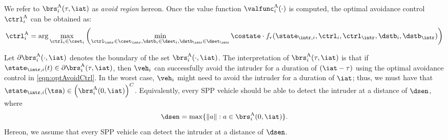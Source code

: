 We refer to $\brs^{\text{A}}_i(\tau, \iat)$ as \textit{avoid region} hereon. Once the value function $\valfunc^{\text{A}}_{i}(\cdot)$ is computed, the optimal avoidance control ${\ctrl^{\text{A}}_{i}}$ can be obtained as:
\begin{equation} \label{eqn:optAvoidCtrl}
{\ctrl^{\text{A}}_{i}} = \arg \max_{\ctrl_i \in \cset_i} \left( \min_{\ctrl_\intr \in \cset_\intr, \dstb_i \in \dset_i, \dstb_\intr \in \dset_\intr} \costate \cdot f_r(\state_{\intr, i}, \ctrl_i, \ctrl_\intr, \dstb_i, \dstb_\intr) \right)
\end{equation}

Let $\partial \brs^{\text{A}}_{i}(\cdot, \iat)$ denotes the boundary of the set $\brs^{\text{A}}_{i}(\cdot, \iat)$. The interpretation of $\brs^{\text{A}}_{i}(\tau, \iat)$ is that if $\state_{\intr, i}(t) \in \partial \brs^{\text{A}}_{i}(\tau, \iat)$, then $\veh_i$ can successfully avoid the intruder for a duration of $(\iat - \tau)$ using the optimal avoidance control in \eqref{eqn:optAvoidCtrl}. In the worst case, $\veh_i$ might need to avoid the intruder for a duration of $\iat$; thus, we must have that  
$\state_{\intr, i}(\tsa) \in \left(\brs^{\text{A}}_{i}(0, \iat)\right)^C$. Equivalently, every SPP vehicle should be able to detect the intruder at a distance of $\dsen$, where
\begin{equation} \label{eqn:sen_distance}
\dsen = \max\{ \|a\|: a \in \brs^{\text{A}}_{i}(0, \iat) \}.
\end{equation} 
Hereon, we assume that every SPP vehicle can detect the intruder at a distance of $\dsen$.

